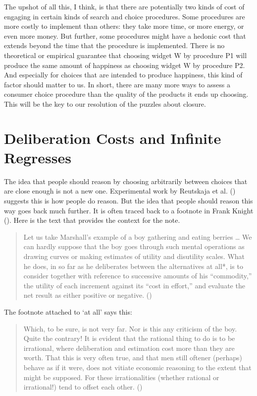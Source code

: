 \documentclass[
  10pt,
  letterpaper,
  twoside]{scrbook}
\begin{document}
The upshot of all this, I think, is that there are potentially two kinds
of cost of engaging in certain kinds of search and choice procedures.
Some procedures are more costly to implement than others: they take more
time, or more energy, or even more money. But further, some procedures
might have a hedonic cost that extends beyond the time that the
procedure is implemented. There is no theoretical or empirical guarantee
that choosing widget W by procedure P1 will produce the same amount of
happiness as choosing widget W by procedure P2. And especially for
choices that are intended to produce happiness, this kind of factor
should matter to us. In short, there are many more ways to assess a
consumer choice procedure than the quality of the products it ends up
choosing. This will be the key to our resolution of the puzzles about
closure.

\section{Deliberation Costs and Infinite
Regresses}\label{sec-deliberationcosts}

The idea that people should reason by choosing arbitrarily between
choices that are close enough is not a new one. Experimental work by
Reutskaja et al. () suggests this is
how people do reason. But the idea that people should reason this way
goes back much further. It is often traced back to a footnote in Frank
Knight (). Here is the text that provides
the context for the note.

\begin{quote}
Let us take Marshall's example of a boy gathering and eating berries
\ldots{} We can hardly suppose that the boy goes through such mental
operations as drawing curves or making estimates of utility and
disutility scales. What he does, in so far as he deliberates between the
alternatives at all*, is to consider together with reference to
successive amounts of his ``commodity,'' the utility of each increment
against its ``cost in effort,'' and evaluate the net result as either
positive or negative. ()
\end{quote}

The footnote attached to `at all' says this:

\begin{quote}
Which, to be sure, is not very far. Nor is this any criticism of the
boy. Quite the contrary! It is evident that the rational thing to do is
to be irrational, where deliberation and estimation cost more than they
are worth. That this is very often true, and that men still oftener
(perhaps) behave as if it were, does not vitiate economic reasoning to
the extent that might be supposed. For these irrationalities (whether
rational or irrational!) tend to offset each other.
()
\end{quote}
\end{document}
